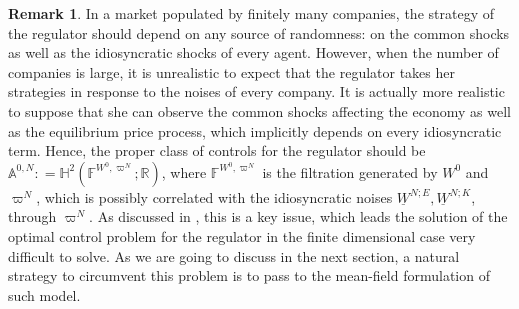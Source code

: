 \documentclass[11pt,twoside]{amsart}
\theoremstyle{definition}
\newtheorem{remark}[theorem]{Remark}
\numberwithin{equation}{section}
\newcommand{\w}{\varpi}
\newcommand{\F}{\mathbb{F}}
\newcommand{\R}{\mathbb{R}}
\begin{document}
\begin{remark}
\label{rmk: controls reg N}
In a market populated by finitely many companies, the strategy of the regulator should depend on any source of randomness: on the common shocks as well as the idiosyncratic shocks of every agent. However, when the number of companies is large, it is unrealistic to expect that the regulator takes her strategies in response to the noises of every company. It is actually more realistic to suppose that she can observe the common shocks affecting the economy as well as the equilibrium price process, which implicitly depends on every idiosyncratic term. Hence, the proper class of controls for the regulator should be $\mathbb{A}^{0,N} : =\mathbb{H}^2( \F^{W^0,\w^N};\R)$, where $\F^{W^0,\w^N}$ is the filtration generated by $W^0$ and $\w^N$, which is possibly correlated with the idiosyncratic noises $\underline{W}^{N;E}, \underline{W}^{N;K}$, through $\w^N$. As discussed in \cite[Remark 3.1]{fujii2022equilibrium}, this is a key issue, which leads the solution of the optimal control problem for the regulator in the finite dimensional case very difficult to solve. As we are going to discuss in the next section, a natural strategy to circumvent this problem is to pass to the mean-field formulation of such model. 
\end{remark}
\end{document}
